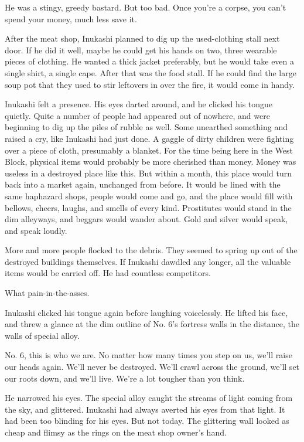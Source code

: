 He was a stingy, greedy bastard. But too bad. Once you're a corpse, you
can't spend your money, much less save it.

After the meat shop, Inukashi planned to dig up the used-clothing stall
next door. If he did it well, maybe he could get his hands on two, three
wearable pieces of clothing. He wanted a thick jacket preferably, but he
would take even a single shirt, a single cape. After that was the food
stall. If he could find the large soup pot that they used to stir
leftovers in over the fire, it would come in handy.

Inukashi felt a presence. His eyes darted around, and he clicked his
tongue quietly. Quite a number of people had appeared out of nowhere,
and were beginning to dig up the piles of rubble as well. Some unearthed
something and raised a cry, like Inukashi had just done. A gaggle of
dirty children were fighting over a piece of cloth, presumably a
blanket. For the time being here in the West Block, physical items would
probably be more cherished than money. Money was useless in a destroyed
place like this. But within a month, this place would turn back into a
market again, unchanged from before. It would be lined with the same
haphazard shops, people would come and go, and the place would fill with
bellows, cheers, laughs, and smells of every kind. Prostitutes would
stand in the dim alleyways, and beggars would wander about. Gold and
silver would speak, and speak loudly.

More and more people flocked to the debris. They seemed to spring up out
of the destroyed buildings themselves. If Inukashi dawdled any longer,
all the valuable items would be carried off. He had countless
competitors.

What pain-in-the-asses.

Inukashi clicked his tongue again before laughing voicelessly. He lifted
his face, and threw a glance at the dim outline of No. 6's fortress
walls in the distance, the walls of special alloy.

No. 6, this is who we are. No matter how many times you step on us,
we'll raise our heads again. We'll never be destroyed. We'll crawl
across the ground, we'll set our roots down, and we'll live. We're a lot
tougher than you think.

He narrowed his eyes. The special alloy caught the streams of light
coming from the sky, and glittered. Inukashi had always averted his eyes
from that light. It had been too blinding for his eyes. But not today.
The glittering wall looked as cheap and flimsy as the rings on the meat
shop owner's hand.

